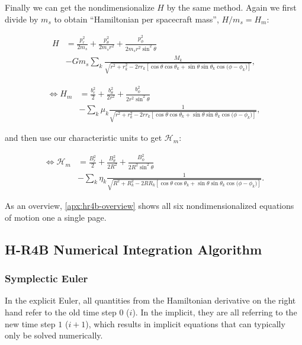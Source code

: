 Finally we can get the nondimensionalize \(H\) by the same method. Again we first divide by \(m_s\) to obtain ``Hamiltonian per spacecraft mass'', \(H/m_s = H_m\):

\begin{equation*}
    \begin{aligned}
        H &= \frac{p_r^2}{2 m_s} + \frac{p_\theta^2}{2 m_s r^2} + \frac{p_\phi^2}{2 m_s r^2 \sin^2{\theta}} \\
        &- G m_s \sum\limits_{k} \frac{M_k}{\sqrt{r^2 + r_k^2 - 2 r r_k \left[\cos{\theta}\cos{\theta_k}+\sin{\theta}\sin{\theta_k}\cos{(\phi - \phi_k})\right]}},
    \end{aligned}
\end{equation*}

\begin{equation}
    \begin{aligned}
        \Leftrightarrow H_m &= \frac{b_r^2}{2} + \frac{b_\theta^2}{2 r^2} + \frac{b_\phi^2}{2 r^2 \sin^2{\theta}} \\
        &- \sum\limits_{k} \mu_k \frac{1}{\sqrt{r^2 + r_k^2 - 2 r r_k \left[\cos{\theta}\cos{\theta_k}+\sin{\theta}\sin{\theta_k}\cos{(\phi - \phi_k})\right]}},
    \end{aligned}
\end{equation}

and then use our characteristic units to get \(\mathcal{H}_m\):

\begin{equation}
    \begin{aligned}
        \Leftrightarrow \mathcal{H}_m &= \frac{B_r^2}{2} + \frac{B_\theta^2}{2 R^2} + \frac{B_\phi^2}{2 R^2 \sin^2{\theta}} \\
        &- \sum\limits_{k} \eta_k \frac{1}{\sqrt{R^2 + R_k^2 - 2 R R_k \left[\cos{\theta}\cos{\theta_k}+\sin{\theta}\sin{\theta_k}\cos{(\phi - \phi_k})\right]}}. \label{eq:HH_m}
    \end{aligned}
\end{equation}

As an overview, \cref{apx:hr4b-overview} shows all six nondimensionalized equations of motion one a single page.

\subsection{H-R4B Numerical Integration Algorithm}

\subsubsection{Symplectic Euler}
In the explicit Euler, all quantities from the Hamiltonian derivative on the right hand refer to the old time step \(0\) ($i$). In the implicit, they are all referring to the new time step \(1\) ($i+1$), which results in implicit equations that can typically only be solved numerically.

